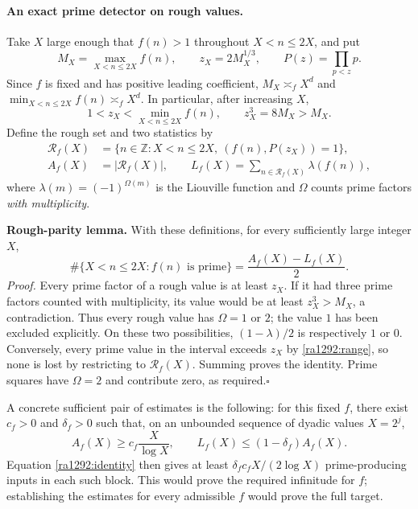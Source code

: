 \documentclass[11pt]{article}
\newcommand{\Z}{\mathbb{Z}}
\begin{document}
\paragraph{An exact prime detector on rough values.}
Take $X$ large enough that $f(n)>1$ throughout $X<n\le2X$, and put
\[
 M_X=\max_{X<n\le2X}f(n),\qquad z_X=2M_X^{1/3},\qquad
 P(z)=\prod_{p<z}p.
\]
Since $f$ is fixed and has positive leading coefficient,
$M_X\asymp_f X^d$ and $\min_{X<n\le2X}f(n)\asymp_f X^d$.
In particular, after increasing $X$,
\begin{equation}\label{ra1292:range}
 1<z_X<\min_{X<n\le2X}f(n),\qquad z_X^3=8M_X>M_X.
\end{equation}
Define the rough set and two statistics by
\begin{align*}
 \mathcal R_f(X)&=\{n\in\Z:X<n\le2X,\ (f(n),P(z_X))=1\},\\
 A_f(X)&=|\mathcal R_f(X)|,\qquad
 L_f(X)=\sum_{n\in\mathcal R_f(X)}\lambda(f(n)),
\end{align*}
where $\lambda(m)=(-1)^{\Omega(m)}$ is the Liouville function and
$\Omega$ counts prime factors \emph{with multiplicity}.

\textbf{Rough-parity lemma.} With these definitions, for every sufficiently
large integer $X$,
\begin{equation}\label{ra1292:identity}
 \#\{X<n\le2X:f(n)\text{ is prime}\}
       =\frac{A_f(X)-L_f(X)}2.
\end{equation}
\emph{Proof.} Every prime factor of a rough value is at least $z_X$.
If it had three prime factors counted with multiplicity, its value would be
at least $z_X^3>M_X$, a contradiction. Thus every rough value has
$\Omega=1$ or $2$; the value $1$ has been excluded explicitly.
On these two possibilities, $(1-\lambda)/2$ is respectively $1$ or $0$.
Conversely, every prime value in the interval exceeds $z_X$ by
\eqref{ra1292:range}, so none is lost by restricting to $\mathcal R_f(X)$.
Summing proves the identity. Prime squares have $\Omega=2$ and contribute
zero, as required.\hfill$\square$

A concrete sufficient pair of estimates is the following: for this fixed
$f$, there exist $c_f>0$ and $\delta_f>0$ such that, on an unbounded sequence
of dyadic values $X=2^j$,
\begin{equation}\label{ra1292:missing}
 A_f(X)\ge c_f\frac{X}{\log X},\qquad
 L_f(X)\le(1-\delta_f)A_f(X).
\end{equation}
Equation \eqref{ra1292:identity} then gives at least
$\delta_fc_fX/(2\log X)$ prime-producing inputs in each such block.
This would prove the required infinitude for $f$; establishing the estimates
for every admissible $f$ would prove the full target.
\end{document}
